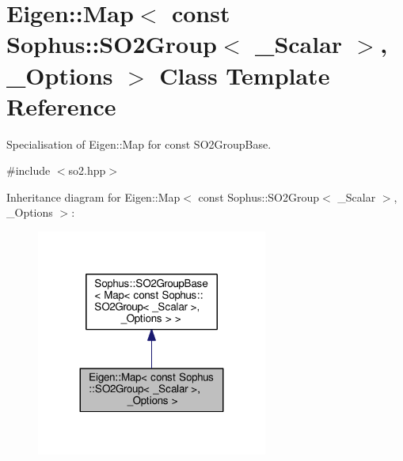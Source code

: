 \hypertarget{class_eigen_1_1_map_3_01const_01_sophus_1_1_s_o2_group_3_01___scalar_01_4_00_01___options_01_4}{}\section{Eigen\+:\+:Map$<$ const Sophus\+:\+:S\+O2\+Group$<$ \+\_\+\+Scalar $>$, \+\_\+\+Options $>$ Class Template Reference}
\label{class_eigen_1_1_map_3_01const_01_sophus_1_1_s_o2_group_3_01___scalar_01_4_00_01___options_01_4}


Specialisation of Eigen\+::\+Map for const S\+O2\+Group\+Base.  




{\ttfamily \#include $<$so2.\+hpp$>$}



Inheritance diagram for Eigen\+:\+:Map$<$ const Sophus\+:\+:S\+O2\+Group$<$ \+\_\+\+Scalar $>$, \+\_\+\+Options $>$\+:
\nopagebreak
\begin{figure}[H]
\begin{center}
\leavevmode
\includegraphics[width=215pt]{class_eigen_1_1_map_3_01const_01_sophus_1_1_s_o2_group_3_01___scalar_01_4_00_01___options_01_4__inherit__graph}
\end{center}
\end{figure}


